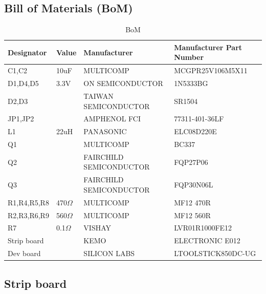 \documentclass[12pt]{article}%
\begin{document}
\subsection{Bill of Materials (BoM)}


\begin{table}[H]
   \centering
   \caption{BoM}
   \label{tab:bom}
   \begin{tabular}{|p{2.5cm}|p{1.2cm}|p{7cm}|p{5cm}|}
   \hline
      	\textbf{Designator}        	& 	\textbf{Value}	&	\textbf{Manufacturer}   		&  	\textbf{Manufacturer Part Number}	\\ \hline
	C1,C2				&	10uF			&	 MULTICOMP				&	MCGPR25V106M5X11			\\ \hline
	D1,D4,D5			&	3.3V			&	ON SEMICONDUCTOR		&	1N5333BG					\\ \hline
	D2,D3				&				&	TAIWAN SEMICONDUCTOR	&	SR1504					\\ \hline
	JP1,JP2			&				&	AMPHENOL FCI	&	77311-401-36LF					\\ \hline
	L1				&	22uH			&	PANASONIC 	&	ELC08D220E			\\ \hline
	Q1				&				& 	MULTICOMP	                              &      BC337		\\ \hline
	Q2				&			&	FAIRCHILD SEMICONDUCTOR	&	FQP27P06		\\ \hline
	Q3				&		&	FAIRCHILD SEMICONDUCTOR	&	FQP30N06L	\\ \hline
	R1,R4,R5,R8		&	470$\Omega$		&	MULTICOMP	&	MF12 470R	\\ \hline
	R2,R3,R6,R9		&	560$\Omega$		&	MULTICOMP	&	MF12 560R	\\ \hline
	R7		&	0.1$\Omega$		&	VISHAY	&  LVR01R1000FE12	\\ \hline
	Strip board		&		&	KEMO & ELECTRONIC	E012	\\ \hline
	Dev board		&		&	SILICON LABS	&  LTOOLSTICK850DC-UG	\\ \hline

   \end{tabular}
\end{table}


\subsection{Strip board}
\end{document}
